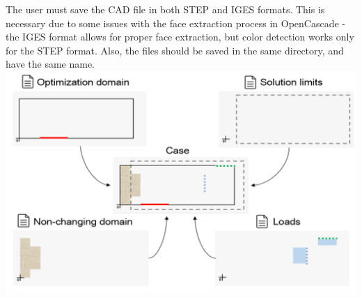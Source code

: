 The user must save the CAD file in both STEP and IGES formats. This is necessary due to some issues with the face extraction process in OpenCascade - the IGES format allows for proper face extraction, but color detection works only for the STEP format. Also, the files should be saved in the same directory, and have the same name.
\includegraphics[width=\textwidth]{Pictures/four_files.png}
